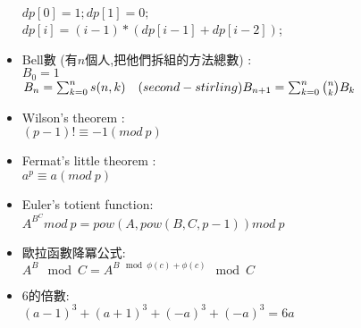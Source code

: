 \begin{itemize}
  $dp[0]=1;dp[1]=0;$\\
  $dp[i]=(i-1)*(dp[i-1]+dp[i-2])$;
\item Bell數 (有$n$個人,把他們拆組的方法總數) : \\
  $B_0= 1$\\
  $B_n= \sum_{k=0}^{n} s(n,k)\quad (second-stirling)\\
  B_{n+1}= \sum_{k=0}^{n}{n \choose k} B_k$
\item Wilson's theorem :\\
  $(p-1)! \equiv -1 (mod \ p)$
\item Fermat's little theorem :\\
  $a^p \equiv a (mod \ p)$
\item Euler's totient function:\\
  $ A ^ {B ^ C} mod \ p = pow(A,pow(B,C,p-1)) mod \ p$
\item 歐拉函數降冪公式:\\
  $A^B \mod C=A^{B \mod \phi(c) + \phi(c)}\mod C$
\item 6的倍數: \\
 $(a-1)^3 + (a+1)^3 + (-a)^3 + (-a)^3 = 6a$
\end{itemize}

